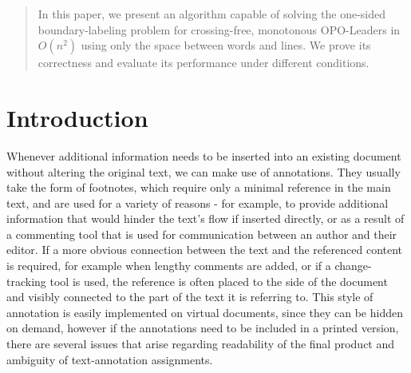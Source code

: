 \documentclass[11pt,a4paper]{vutinfth}
\begin{document}
\frontmatter
\addstatementpage




\begin{abstract}
	In this paper, we present an algorithm capable of solving the one-sided boundary-labeling problem for crossing-free, monotonous OPO-Leaders in $O(n^2)$ using only the space between words and lines. We prove its correctness and evaluate its performance under different conditions.
\end{abstract}


\tableofcontents

\mainmatter

\chapter{Introduction}
Whenever additional information needs to be inserted into an existing document without altering the original text, we can make use of annotations. They usually take the form of footnotes, which require only a minimal reference in the main text, and are used for a variety of reasons - for example, to provide additional information that would hinder the text's flow if inserted directly, or as a result of a commenting tool that is used for communication between an author and their editor.
If a more obvious connection between the text and the referenced content is required, for example when lengthy comments are added, or if a change-tracking tool is used, the reference is often placed to the side of the document and visibly connected to the part of the text it is referring to. This style of annotation is easily implemented on virtual documents, since they can be hidden on demand, however if the annotations need to be included in a printed version, there are several issues that arise regarding readability of the final product and ambiguity of text-annotation assignments.
\end{document}
